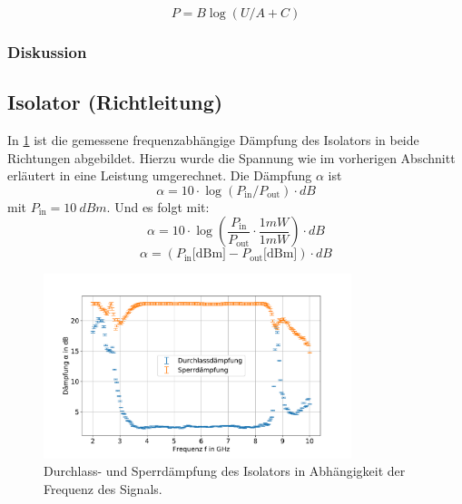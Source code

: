 \documentclass[
	a4paper,
	12pt,
	pagesize,
	ngerman
]{scrartcl}
\begin{document}
	\begin{equation}
		\label{eq_inv_kali}
		P = B\log{(U/A+C)}
	\end{equation}
	\subsubsection*{Diskussion}


	\subsection{Isolator (Richtleitung)}
	In \cref{fig_isolator} ist die gemessene frequenzabhängige Dämpfung des Isolators in beide Richtungen abgebildet.
	Hierzu wurde die Spannung wie im vorherigen Abschnitt erläutert in eine Leistung umgerechnet.
	Die Dämpfung $\alpha$ ist
	\begin{equation}
		\alpha = 10 \cdot \log{(P_{\text{in}}/P_{\text{out}})} \cdot \si{dB}
	\end{equation}
  mit $P_\text{in}=\SI{10}{dBm}$.
	Und es folgt mit:
	\begin{equation}
		\alpha = 10 \cdot \log{\left(\frac{P_{\text{in}}}{P_{\text{out}}} \cdot \frac{1mW}{1mW}\right)} \cdot\si{dB}
	\end{equation}
	\begin{equation}
		\alpha = (P_\text{in} \text{[dBm]} - P_\text{out} \text{[dBm]} ) \cdot\si{dB}
	\end{equation}
	\begin{figure}[H]
		\includegraphics[width=0.8\textwidth]{img/isolator}
		\centering
		\caption{
		Durchlass- und Sperrdämpfung des Isolators in Abhängigkeit der Frequenz des Signals.
		}
		\label{fig_isolator}
		\centering
	\end{figure}
\end{document}
